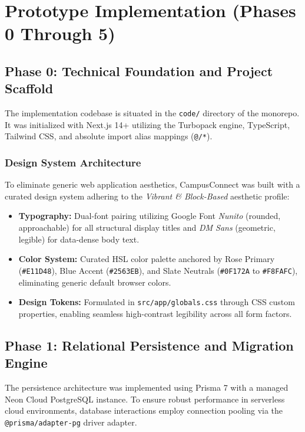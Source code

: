 \documentclass[12pt, a4paper, oneside]{report}
\begin{document}
\chapter{Prototype Implementation (Phases 0 Through 5)}

\section{Phase 0: Technical Foundation and Project Scaffold}
The implementation codebase is situated in the \texttt{code/} directory of the monorepo. It was initialized with Next.js 14+ utilizing the Turbopack engine, TypeScript, Tailwind CSS, and absolute import alias mappings (\texttt{@/*}).

\subsection{Design System Architecture}
To eliminate generic web application aesthetics, CampusConnect was built with a curated design system adhering to the \textit{Vibrant \& Block-Based} aesthetic profile:
\begin{itemize}[leftmargin=0.7cm]
    \item \textbf{Typography:} Dual-font pairing utilizing Google Font \textit{Nunito} (rounded, approachable) for all structural display titles and \textit{DM Sans} (geometric, legible) for data-dense body text.
    \item \textbf{Color System:} Curated HSL color palette anchored by Rose Primary (\texttt{\#E11D48}), Blue Accent (\texttt{\#2563EB}), and Slate Neutrals (\texttt{\#0F172A} to \texttt{\#F8FAFC}), eliminating generic default browser colors.
    \item \textbf{Design Tokens:} Formulated in \texttt{src/app/globals.css} through CSS custom properties, enabling seamless high-contrast legibility across all form factors.
\end{itemize}

\section{Phase 1: Relational Persistence and Migration Engine}
The persistence architecture was implemented using Prisma 7 with a managed Neon Cloud PostgreSQL instance. To ensure robust performance in serverless cloud environments, database interactions employ connection pooling via the \texttt{@prisma/adapter-pg} driver adapter.
\end{document}

